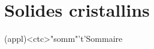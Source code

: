 \documentclass[../../main/main.tex]{subfiles}
\begin{document}
\setcounter{chapter}{2}


\chapter{Solides cristallins}

\vspace*{\fill}

\begin{tcn}(appl)<ctc>"somm"'t'{Sommaire}
	\let\item\olditem
	\vspace{-15pt}
	\minitoc
	\vspace{-25pt}
\end{tcn}
\end{document}
